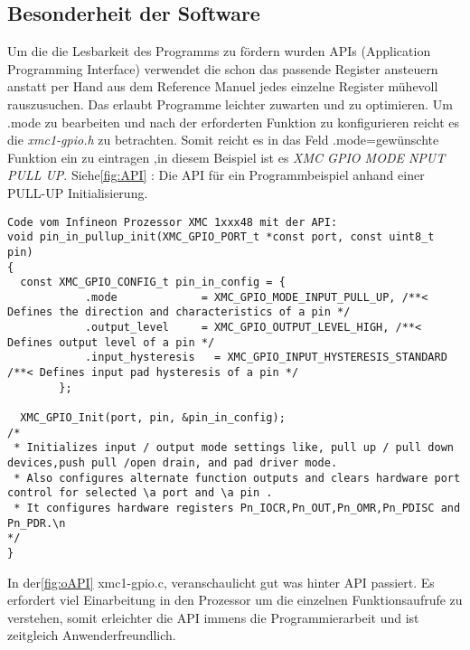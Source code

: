 \subsection{Besonderheit der Software}
Um die die Lesbarkeit des Programms zu fördern wurden APIs (Application Programming Interface) verwendet die schon das passende Register ansteuern anstatt per Hand aus dem Reference Manuel jedes einzelne Register mühevoll rauszusuchen. Das erlaubt Programme leichter zuwarten und zu optimieren.
Um .mode zu bearbeiten und nach der erforderten Funktion zu konfigurieren reicht es die  \textit {xmc1-gpio.h} zu betrachten. Somit reicht es in das Feld .mode=gewünschte Funktion ein zu eintragen ,in diesem Beispiel ist es \textit{XMC GPIO MODE NPUT PULL UP}.
Siehe\ref{fig:API} : Die API für ein Programmbeispiel anhand einer PULL-UP Initialisierung.
\\
\begin{minipage}{1\textwidth}
\begin{lstlisting}
Code vom Infineon Prozessor XMC 1xxx48 mit der API:
void pin_in_pullup_init(XMC_GPIO_PORT_t *const port, const uint8_t pin)
{
  const	XMC_GPIO_CONFIG_t pin_in_config = {
  			.mode             = XMC_GPIO_MODE_INPUT_PULL_UP, /**< Defines the direction and characteristics of a pin */
  			.output_level     = XMC_GPIO_OUTPUT_LEVEL_HIGH, /**< Defines output level of a pin */
  			.input_hysteresis	= XMC_GPIO_INPUT_HYSTERESIS_STANDARD /**< Defines input pad hysteresis of a pin */
  		};

  XMC_GPIO_Init(port, pin, &pin_in_config);
/*
 * Initializes input / output mode settings like, pull up / pull down devices,push pull /open drain, and pad driver mode.
 * Also configures alternate function outputs and clears hardware port control for selected \a port and \a pin .
 * It configures hardware registers Pn_IOCR,Pn_OUT,Pn_OMR,Pn_PDISC and Pn_PDR.\n
*/
}
\end{lstlisting}
\label{fig:API}
\end{minipage}

 In der\ref{fig:oAPI} xmc1-gpio.c, veranschaulicht gut was hinter API passiert. Es erfordert viel Einarbeitung in den Prozessor um die einzelnen Funktionsaufrufe zu verstehen, somit erleichter die API immens die Programmierarbeit und ist zeitgleich Anwenderfreundlich.



